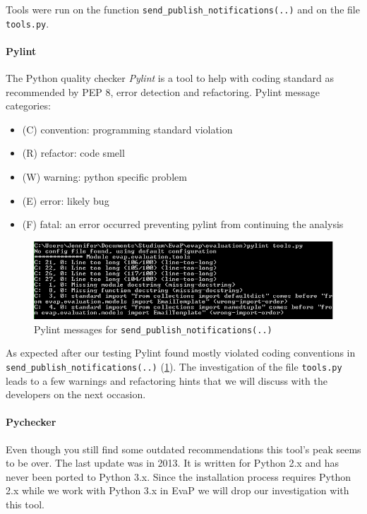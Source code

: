 Tools were run on the function \texttt{send\_publish\_notifications(..)} and on the file \texttt{tools.py}.

\paragraph{Pylint}
The Python quality checker \emph{Pylint} is a tool to help with coding standard as recommended by PEP 8, error detection and refactoring.
Pylint message categories:
\begin{itemize}
    \item (C) convention: programming standard violation
    \item (R) refactor: code smell
    \item (W) warning: python specific problem
    \item (E) error: likely bug
    \item (F) fatal: an error occurred preventing pylint from continuing the analysis
\end{itemize}
\begin{figure}[h]
    \centering
    \includegraphics[width=\textwidth, keepaspectratio]{graphics/pylint_send_publish_notifications_1}
    \caption{Pylint messages for \texttt{send\_publish\_notifications(..)}}
    \label{fig:pylint}
\end{figure} 
As expected after our testing Pylint found mostly violated coding conventions in \texttt{send\_publish\_notifications(..)} (\ref{fig:pylint}). 
The investigation of the file \texttt{tools.py} leads to a few warnings and refactoring hints that we will discuss with the developers on the next occasion.


\paragraph{Pychecker}
Even though you still find some outdated recommendations this tool's peak seems to be over. 
The last update was in 2013.
It is written for Python 2.x and has never been ported to Python 3.x.
Since the installation process requires Python 2.x while we work with Python 3.x in EvaP we will drop our investigation with this tool.

